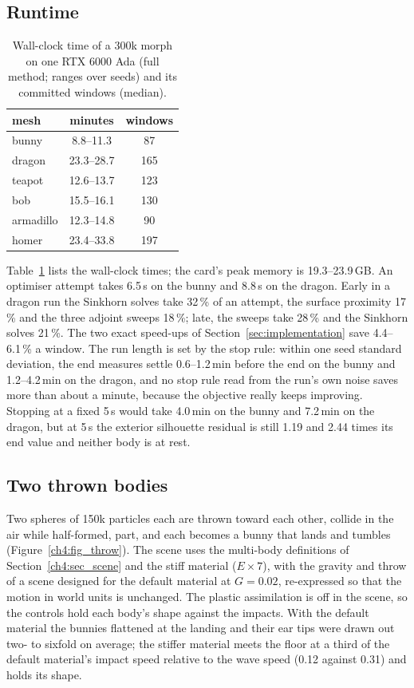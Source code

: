 \subsection{Runtime}
\label{ch4:sec_runtime}
\begin{table}[t]
\centering
\footnotesize
\caption{Wall-clock time of a 300k morph on one RTX 6000 Ada (full method; ranges over seeds) and its committed windows
(median).}
\label{ch4:tab_runtime}
\begin{tabular}{lcc}
\toprule
mesh & minutes & windows \\
\midrule
bunny & 8.8--11.3 & 87 \\
dragon & 23.3--28.7 & 165 \\
teapot & 12.6--13.7 & 123 \\
bob & 15.5--16.1 & 130 \\
armadillo & 12.3--14.8 & 90 \\
homer & 23.4--33.8 & 197 \\
\bottomrule
\end{tabular}
\end{table}
Table~\ref{ch4:tab_runtime} lists the wall-clock times; the card's peak memory is 19.3--23.9\,GB. An optimiser attempt
takes 6.5\,s on the bunny and 8.8\,s on the dragon. Early in a dragon run the Sinkhorn solves take 32\,\% of an attempt,
the surface proximity 17\,\% and the three adjoint sweeps 18\,\%; late, the sweeps take 28\,\% and the Sinkhorn solves
21\,\%. The two exact speed-ups of Section~\ref{sec:implementation} save 4.4--6.1\,\% a window. The run length is set by
the stop rule: within one seed standard deviation, the end measures settle 0.6--1.2\,min before the end on the bunny and
1.2--4.2\,min on the dragon, and no stop rule read from the run's own noise saves more than about a minute, because the
objective really keeps improving. Stopping at a fixed 5\,s would take 4.0\,min on the bunny and 7.2\,min on the dragon,
but at 5\,s the exterior silhouette residual is still 1.19 and 2.44 times its end value and neither body is at rest.

\subsection{Two thrown bodies}
\label{ch4:sec_throw}
Two spheres of 150k particles each are thrown toward each other, collide in the air while half-formed, part, and each
becomes a bunny that lands and tumbles (Figure~\ref{ch4:fig_throw}). The scene uses the multi-body definitions of
Section~\ref{ch4:sec_scene} and the stiff material ($E\times7$), with the gravity and throw of a scene designed for the
default material at $G=0.02$, re-expressed so that the motion in world units is unchanged. The plastic assimilation is
off in the scene, so the controls hold each body's shape against the impacts. With the default material the bunnies
flattened at the landing and their ear tips were drawn out two- to sixfold on average; the stiffer material meets the
floor at a third of the default material's impact speed relative to the wave speed (0.12 against 0.31) and holds its
shape.

